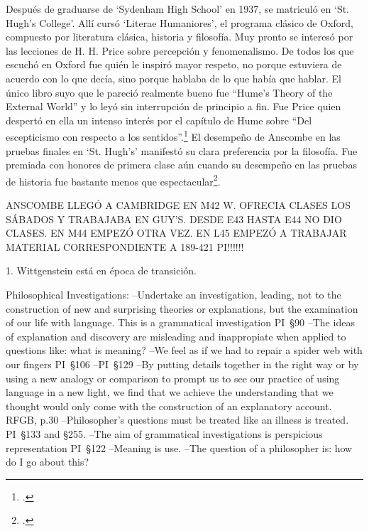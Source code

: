 Después de graduarse de `Sydenham High School' en 1937, se matriculó en `St.
Hugh's College'. Allí cursó `Literae Humaniores', el programa clásico de Oxford,
compuesto por literatura clásica, historia y filosofía. Muy pronto se interesó
por las lecciones de H. H. Price sobre percepción y fenomenalismo. De todos los
que escuchó en Oxford fue quién le inspiró mayor respeto, no porque estuviera de
acuerdo con lo que decía, sino porque hablaba de lo que había que hablar. El
único libro suyo que le pareció realmente bueno fue ``Hume's Theory of the
External World'' y lo leyó sin interrupción de principio a
fin. Fue Price quien despertó en ella un intenso interés por el capítulo de Hume
sobre ``Del escepticismo con respecto a los sentidos''.\footcite[cf.~][p.~viii
\S1]{M&PotM} El desempeño de Anscombe en las pruebas finales en `St. Hugh's'
manifestó su clara preferencia por la filosofía. Fue premiada con honores de
primera clase aún cuando su desempeño en las pruebas de historia fue bastante
menos que espectacular\footcite[p.~3~\S1]{teichmann}.

ANSCOMBE LLEGÓ A CAMBRIDGE EN M42 W. OFRECIA CLASES LOS SÁBADOS Y TRABAJABA EN
GUY'S. DESDE E43 HASTA E44 NO DIO CLASES. EN M44 EMPEZÓ OTRA VEZ. EN L45 EMPEZÓ
A TRABAJAR MATERIAL CORRESPONDIENTE A 189-421 PI!!!!!!

1. Wittgenstein está en época de transición.
\begin{revision}
Philosophical Investigations:
--Undertake an investigation, leading, not to the construction of new and
surprising theories or explanations, but the examination of our life with
language. This is a grammatical investigation PI~\S90 
--The ideas of explanation and discovery are misleading and inappropiate when
applied to questions like: what is meaning?
--We feel as if we had to repair a spider web with our fingers PI~\S106
--PI~\S129
--By putting details together in the right way or by using a new analogy or
comparison to prompt us to see our practice of using language in a new light, we
find that we achieve the understanding that we thought would only come with the
construction of an explanatory account. RFGB, p.30
--Philosopher's questions must be treated like an illness is treated. PI~\S133
and \S255.
--The aim of grammatical investigations is perspicious representation PI~\S122
--Meaning is use.
--The question of a philosopher is: how do I go about this?
\end{revision}


